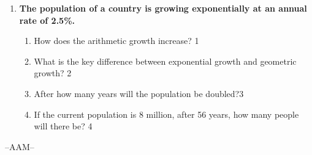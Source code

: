 \documentclass[12pt]{article}
\begin{document}
\begin{enumerate}
  \begin{enumerate}
    \item What is a discrete random variable? \hfill 1
    \item What are the required properties of a probability distribution? \hfill 2
  
    \item
    	Calculate the marginal probability \( P(Y) \). \hfill 3
    \item
     	Determine \( P(Y \vert X = 1) \) and \( P(Y \vert X = 0) \). \hfill 4
  \end{enumerate}
  
  
 \item
  \textbf{The population of a country is growing exponentially at an annual rate of 2.5\%.}

  
  \begin{enumerate}
    \item
	How does the arithmetic growth increase? \hfill 1
    \item
    What is the key difference between exponential growth and geometric growth? \hfill 2
    \item  
	After how many years will the  population be doubled?\hfill 3
    \item
	If the current population is 8 million, after 56 years, how many people will there be? \hfill 4
  \end{enumerate}

\end{enumerate}

 \vspace{2.5cm}

\begin{center}

  \vfill
  --AAM--
\end{center}
\end{document}
